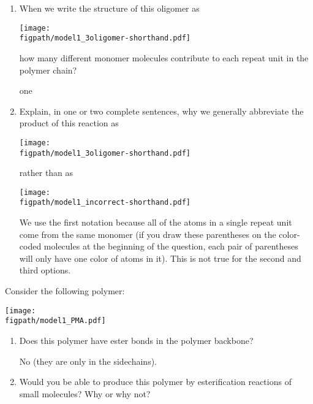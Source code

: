 \begin{activity}
\begin{ctqs}
\begin{enumerate}
			\item When we write the structure of this oligomer as
	
	\centerline{\texttt{[image: \\figpath/model1\_3oligomer-shorthand.pdf]}}
	\vspace{-3pt}
	how many different monomer molecules contribute to each repeat unit in the polymer chain?
			
				\begin{solution}[1in]
					one
				\end{solution}
		
			\item Explain, in one or two complete sentences, why we generally abbreviate the product of this reaction as
	
	\centerline{\texttt{[image: \\figpath/model1\_3oligomer-shorthand.pdf]}}
	
	rather than as
	
	\centerline{\texttt{[image: \\figpath/model1\_incorrect-shorthand.pdf]}}
			
				\begin{solution}[2in]
					We use the first notation because all of the atoms in a single repeat unit come from the same monomer (if you draw these parentheses on the color-coded molecules at the beginning of the question, each pair of parentheses will only have one color of atoms in it).  This is not true for the second and third options.
				\end{solution}
			
		\end{enumerate}
	
	\question Consider the following polymer:\label{\labelbase:ctq:PMA}
	
	\centerline{\texttt{[image: \\figpath/model1\_PMA.pdf]}}
	
		\begin{enumerate}
				
			\item Does this polymer have ester bonds in the polymer backbone?
			
				\begin{solution}[0.75in]
					No (they are only in the sidechains).
				\end{solution}
		
			\item Would you be able to produce this polymer by esterification reactions of small molecules?  Why or why not?
			

\end{enumerate}
\end{ctqs}
\end{activity}
